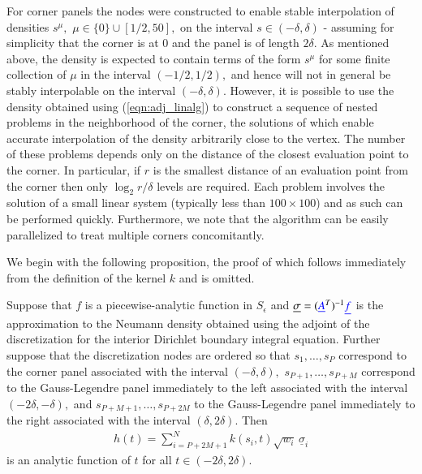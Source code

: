 For corner panels the nodes were constructed to enable stable interpolation of densities $s^\mu,$ $\mu \in \{0\} \cup [1/2,50],$ on the interval $s \in (-\delta,\delta)$ - assuming for simplicity that the corner is at $0$ and the panel is of length $2 \delta.$ As mentioned above, the density is expected to contain terms of the form $s^\mu$ for some finite collection of $\mu$ in the interval $(-1/2,1/2),$ and hence will not in general be stably interpolable on the interval $(-\delta,\delta).$ However, it is possible to use the density obtained using (\ref{eqn:adj_linalg}) to construct a sequence of nested problems in the neighborhood of the corner, the solutions of which enable accurate interpolation of the density arbitrarily close to the vertex. The number of these problems depends only on the distance of the closest evaluation point to the corner. In particular, if $r$ is the smallest distance of an evaluation point from the corner then only $\log_2 r/\delta$ levels are required. Each problem involves the solution of a small linear system (typically less than $100 \times 100$) and as such can be performed quickly. Furthermore, we note that the algorithm can be easily parallelized to treat multiple corners concomitantly.

We begin with the following proposition, the proof of which follows immediately from the definition of the kernel $k$ and is omitted.
\begin{proposition}\label{prop_hanalytic}
Suppose that $f$ is a piecewise-analytic function in $S_\epsilon$ and  $\underline{\sigma} = ({\color{blue} \underline{A}}^T)^{-1} {\color{blue} \underline{f}}$ is the approximation to the Neumann density obtained using the adjoint of the discretization for the interior Dirichlet boundary integral equation. Further suppose that the discretization nodes are ordered so that $s_1,\dots,s_P$ correspond to the corner panel associated with the interval $(-\delta,\delta),$ $s_{P+1},\dots,s_{P+M}$ correspond to the Gauss-Legendre panel immediately to the left associated with the interval $(-2\delta,-\delta),$ and $s_{P+M+1},\dots,s_{P+2M}$ to the Gauss-Legendre panel immediately to the right associated with the interval $(\delta,2\delta).$
Then
\begin{align}\label{eqn:def_hfun}
h(t) = \sum_{i=P+2M+1}^N k(s_i,t) \sqrt{w_i} \,\underline{\sigma}_i
\end{align}
is an analytic function of $t$ for all $t \in (-2\delta,2\delta).$
\end{proposition}

